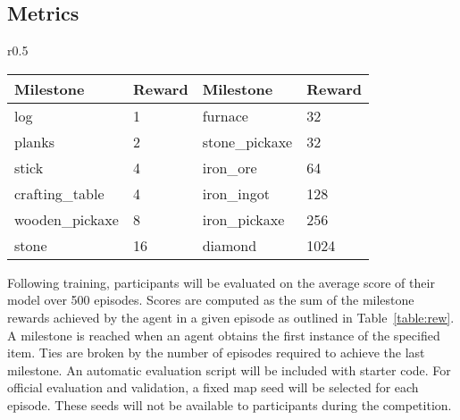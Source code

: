 \subsection{Metrics}
\label{sec:metrics}

\begin{wraptable}{r}{0.5 \textwidth}
    \vspace{-20pt}
    \centering
    \tiny
    \begin{tabular}{ll|ll} 
        {Milestone} & {Reward} & {Milestone} & {Reward} \\
        \midrule
        log & 1                & furnace & 32  \\
        planks & 2             & stone\_pickaxe & 32  \\
        stick & 4              & iron\_ore & 64  \\
        crafting\_table & 4    & iron\_ingot & 128  \\
        wooden\_pickaxe & 8    & iron\_pickaxe &  256 \\
        stone & 16             & diamond & 1024 
     \end{tabular}
     \caption{
        \small Rewards for sub-goals and main goal (diamond) for \texttt{Obtain Diamond}.}
    \label{table:rew}
    \vspace{-10pt}
\end{wraptable} 

Following training, participants will be evaluated on the average score of their model over 500 episodes.
Scores are computed as the sum of the milestone rewards achieved by the agent in a given episode as outlined in Table~\ref{table:rew}. 
A milestone is reached when an agent obtains the first instance of the specified item. 
Ties are broken by the number of episodes required to achieve the last milestone. 
An automatic evaluation script will be included with starter code. 
For official evaluation and validation, a fixed map seed will be selected for each episode. These seeds will not be available to participants during the competition.

